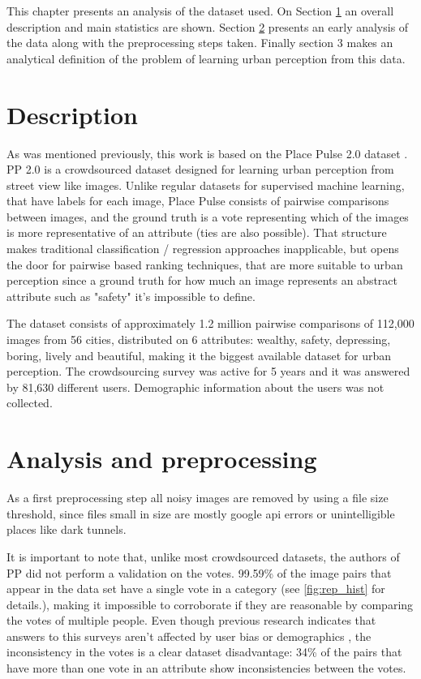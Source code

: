 This chapter presents an analysis of the dataset used. On Section \ref{sec:dataset_desc} an overall description
and main statistics are shown. Section \ref{sec:dataset_prep} presents an early analysis of the data along with
the preprocessing steps taken. Finally section 3 makes an analytical definition of the problem
of learning urban perception from this data.


\section{Description}
\label{sec:dataset_desc}
As was mentioned previously, this work is based on the Place Pulse 2.0 dataset \cite{hidalgo_placepulse}.
PP 2.0 is a crowdsourced dataset designed for learning urban perception from street view like images.
Unlike regular datasets for supervised machine learning, that have labels for each image, Place Pulse
consists of pairwise comparisons between images, and the ground truth is a vote representing which of
the images is more representative of an attribute (ties are also possible). That structure makes
traditional classification / regression approaches inapplicable, but opens the door for
pairwise based ranking techniques, that are more suitable to urban perception since a ground truth for
how much an image represents an abstract attribute such as "safety" it's impossible to define.

The dataset consists of approximately 1.2 million pairwise comparisons of 112,000 images from 56 cities,
distributed on 6 attributes: wealthy, safety, depressing, boring, lively and beautiful, making it
the biggest available dataset for urban perception. The crowdsourcing survey was
active for 5 years and it was answered by 81,630 different users. Demographic information
about the users was not collected.

\section{Analysis and preprocessing}
\label{sec:dataset_prep}

As a first preprocessing step all noisy images are removed by using a file size threshold,
since files small in size are mostly  google api errors or unintelligible places like
dark tunnels.

It is important to note that, unlike most crowdsourced datasets, the authors of PP did not
perform a validation on the votes. 99.59\% of the image pairs that appear in the
data set have a single vote in a category (see \ref{fig:rep_hist} for details.),
making it impossible to corroborate if they are reasonable by comparing the votes of multiple people.
Even though previous research indicates that answers to this surveys aren't affected by user
bias or demographics \cite{hidalgo_inequality, costa_lisbon}, the inconsistency in the votes is a
clear dataset disadvantage: 34\% of the  pairs that have more than one vote in an attribute
show inconsistencies between the votes.


